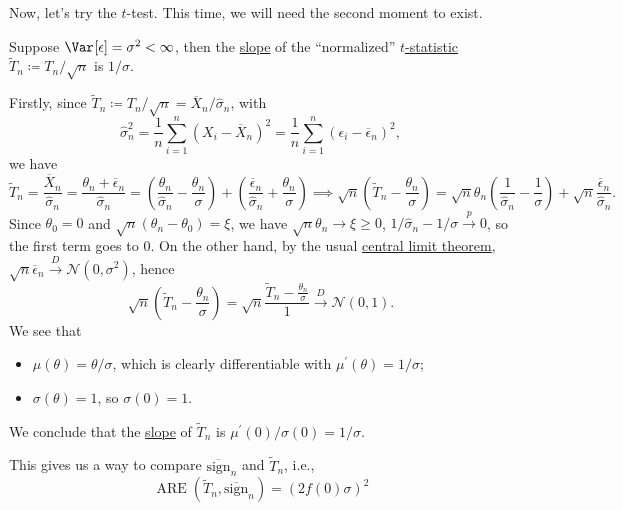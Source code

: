 Now, let's try the \(t\)-test. This time, we will need the second moment to exist.

\begin{eg}[\(t\)-test]
	Suppose \(\Var_{}[\epsilon ] = \sigma ^2 < \infty \), then the \hyperref[def:slope]{slope} of the ``normalized'' \hyperref[def:t-statistic]{\(t\)-statistic} \(\widetilde{T} _n \coloneqq T_n / \sqrt{n}\) is \(1 / \sigma \).
\end{eg}
\begin{explanation}
	Firstly, since \(\widetilde{T} _n \coloneqq T_n / \sqrt{n} = \overline{X} _n / \hat{\sigma} _n\), with
	\[
		\hat{\sigma} _n^2
		= \frac{1}{n} \sum_{i=1}^{n} (X_i - \overline{X} _n)^2
		= \frac{1}{n} \sum_{i=1}^{n} (\epsilon _i - \overline{\epsilon} _n)^2,
	\]
	we have
	\[
		\widetilde{T} _n
		= \frac{\overline{X} _n}{\hat{\sigma} _n}
		= \frac{\theta _n + \overline{\epsilon} _n}{\hat{\sigma} _n}
		= \left( \frac{\theta _n}{\hat{\sigma} _n} - \frac{\theta _n}{\sigma } \right) + \left( \frac{\overline{\epsilon} _n}{\hat{\sigma} _n} + \frac{\theta _n}{\sigma } \right)
		\implies
		\sqrt{n} \left( \widetilde{T} _n - \frac{\theta _n}{\sigma } \right)
		= \sqrt{n} \theta _n \left( \frac{1}{\hat{\sigma} _n} - \frac{1}{\sigma } \right) + \sqrt{n} \frac{\overline{\epsilon} _n}{\hat{\sigma} _n}.
	\]
	Since \(\theta _0 = 0\) and \(\sqrt{n} (\theta _n - \theta _0) = \xi \), we have \(\sqrt{n} \theta _n \to \xi \geq 0\), \(1 / \hat{\sigma} _n - 1 / \sigma \overset{p}{\to} 0\), so the first term goes to \(0\). On the other hand, by the usual \hyperref[thm:CLT]{central limit theorem}, \(\sqrt{n} \overline{\epsilon} _n \overset{D}{\to} \mathcal{N} (0, \sigma ^2)\), hence
	\[
		\sqrt{n} \left( \widetilde{T} _n - \frac{\theta _n}{\sigma } \right)
		= \sqrt{n} \frac{\widetilde{T} _n - \frac{\theta _n}{\sigma }}{1}
		\overset{D}{\to} \mathcal{N} (0, 1).
	\]
	We see that
	\begin{itemize}
		\item \(\mu (\theta ) = \theta / \sigma \), which is clearly differentiable with \(\mu ^{\prime} (\theta ) = 1 / \sigma \);
		\item \(\sigma (\theta ) = 1\), so \(\sigma (0) = 1\).
	\end{itemize}
	We conclude that the \hyperref[def:slope]{slope} of \(\widetilde{T} _n\) is \(\mu ^{\prime} (0) / \sigma (0) = 1 / \sigma \).
\end{explanation}

This gives us a way to compare \(\overline{\mathrm{sign} }_n \) and \(\widetilde{T} _n\), i.e.,
\[
	\operatorname{ARE}(\widetilde{T} _n, \overline{\mathrm{sign}} _n)
	= \left( 2 f(0) \sigma \right) ^2
\]

